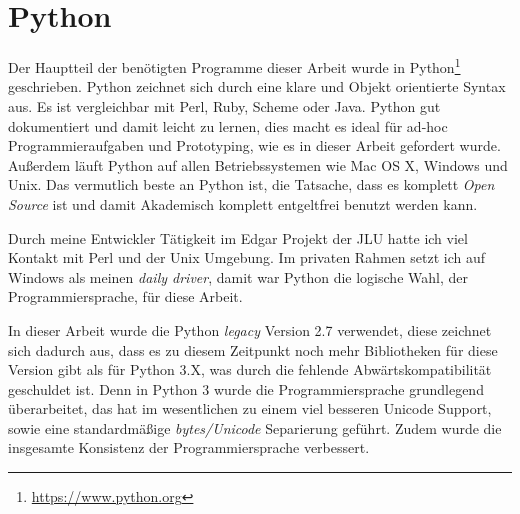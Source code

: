 \section{Python}
Der Hauptteil der benötigten Programme dieser Arbeit wurde in Python\footnote{\url{https://www.python.org}} geschrieben. Python zeichnet sich durch eine klare und Objekt orientierte Syntax aus. Es ist vergleichbar mit Perl, Ruby, Scheme oder Java. Python gut dokumentiert und damit leicht zu lernen, dies macht es ideal für ad-hoc Programmieraufgaben und Prototyping, wie es in dieser Arbeit gefordert wurde. Außerdem läuft Python auf allen Betriebssystemen wie Mac OS X, Windows und Unix. Das vermutlich beste an Python ist, die Tatsache, dass es komplett \emph{Open Source} ist und damit Akademisch komplett entgeltfrei benutzt werden kann.

Durch meine Entwickler Tätigkeit im Edgar\cite{Yu.2017} Projekt der JLU hatte ich viel Kontakt mit Perl und der Unix Umgebung. Im privaten Rahmen setzt ich auf Windows als meinen \emph{daily driver}, damit war Python die logische Wahl, der Programmiersprache, für diese Arbeit.

In dieser Arbeit wurde die Python \emph{legacy} Version 2.7 verwendet, diese zeichnet sich dadurch aus, dass es zu diesem Zeitpunkt noch mehr Bibliotheken für diese Version gibt als für Python 3.X, was durch die fehlende Abwärtskompatibilität geschuldet ist. Denn in Python 3 wurde die Programmiersprache grundlegend überarbeitet, das hat im wesentlichen zu einem viel besseren Unicode Support, sowie eine standardmäßige \emph{bytes/Unicode} Separierung geführt. Zudem wurde die insgesamte Konsistenz der Programmiersprache verbessert.


